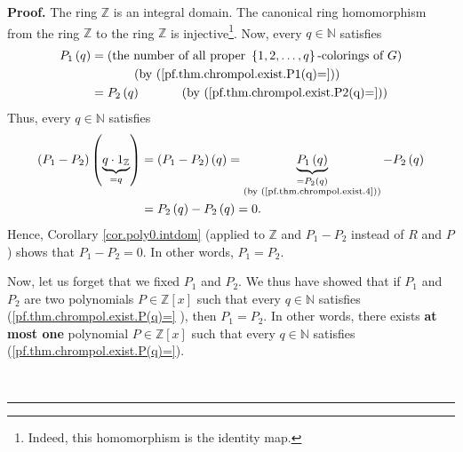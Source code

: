 \documentclass[numbers=enddot,12pt,final,onecolumn,notitlepage]{scrartcl}%
\theoremstyle{definition}
\newenvironment{proof}[1][Proof]{\noindent\textbf{#1.} }{\ \rule{0.5em}{0.5em}}
\newenvironment{verlong}{}{}
\begin{document}
\begin{verlong}
\begin{proof}
The ring $\mathbb{Z}$ is an integral domain. The canonical ring homomorphism
from the ring $\mathbb{Z}$ to the ring $\mathbb{Z}$ is
injective\footnote{Indeed, this homomorphism is the identity map.}. Now, every
$q\in\mathbb{N}$ satisfies%
\begin{align}
P_{1}\left(  q\right)   &  =\left(  \text{the number of all proper }\left\{
1,2,\ldots,q\right\}  \text{-colorings of }G\right) \nonumber\\
&  \ \ \ \ \ \ \ \ \ \ \left(  \text{by (\ref{pf.thm.chrompol.exist.P1(q)=}%
)}\right) \nonumber\\
&  =P_{2}\left(  q\right)  \ \ \ \ \ \ \ \ \ \ \left(  \text{by
(\ref{pf.thm.chrompol.exist.P2(q)=})}\right)  \label{pf.thm.chrompol.exist.4}%
\end{align}
Thus, every $q\in\mathbb{N}$ satisfies%
\begin{align*}
\left(  P_{1}-P_{2}\right)  \left(  \underbrace{q\cdot1_{\mathbb{Z}}}%
_{=q}\right)   &  =\left(  P_{1}-P_{2}\right)  \left(  q\right)
=\underbrace{P_{1}\left(  q\right)  }_{\substack{=P_{2}\left(  q\right)
\\\text{(by (\ref{pf.thm.chrompol.exist.4}))}}}-P_{2}\left(  q\right) \\
&  =P_{2}\left(  q\right)  -P_{2}\left(  q\right)  =0.
\end{align*}
Hence, Corollary \ref{cor.poly0.intdom} (applied to $\mathbb{Z}$ and
$P_{1}-P_{2}$ instead of $R$ and $P$) shows that $P_{1}-P_{2}=0$. In other
words, $P_{1}=P_{2}$.

Now, let us forget that we fixed $P_{1}$ and $P_{2}$. We thus have showed that
if $P_{1}$ and $P_{2}$ are two polynomials $P\in\mathbb{Z}\left[  x\right]  $
such that every $q\in\mathbb{N}$ satisfies (\ref{pf.thm.chrompol.exist.P(q)=}%
), then $P_{1}=P_{2}$. In other words, there exists \textbf{at most one}
polynomial $P\in\mathbb{Z}\left[  x\right]  $ such that every $q\in\mathbb{N}$
satisfies (\ref{pf.thm.chrompol.exist.P(q)=}).


\end{proof}
\end{verlong}
\end{document}
